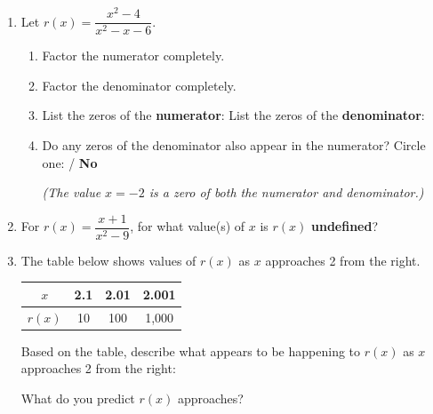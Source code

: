 \documentclass[10pt]{article}
\begin{document}
\namedateperiod

\vspace{0.14in}

\begin{enumerate}[itemsep=14pt]

\item Let $r(x) = \dfrac{x^2 - 4}{x^2 - x - 6}$.

\begin{enumerate}[label=(\alph*), itemsep=6pt]
  \item Factor the numerator completely. \quad {}

  \item Factor the denominator completely. \quad {}

  \item List the zeros of the \textbf{numerator}:  \quad
        List the zeros of the \textbf{denominator}: 

  \item Do any zeros of the denominator also appear in the numerator? Circle one:
        \quad {} \quad / \quad \textbf{No}

        \textit{(The value $x = -2$ is a zero of both the numerator and denominator.)}
\end{enumerate}

\item For $r(x) = \dfrac{x + 1}{x^2 - 9}$, for what value(s) of $x$ is $r(x)$ \textbf{undefined}?

\vspace{0.1in}

\item The table below shows values of $r(x)$ as $x$ approaches 2 from the right.

\smallskip
\renewcommand{\arraystretch}{1.3}
\begin{tabular}{|c|c|c|c|}
\hline
$x$    & 2.1 & 2.01 & 2.001 \\
\hline
$r(x)$ & 10  & 100  & 1{,}000 \\
\hline
\end{tabular}
\smallskip

Based on the table, describe what appears to be happening to $r(x)$ as $x$ approaches 2
from the right:

\vspace{0.1in}

\vspace{0.1in}
What do you predict $r(x)$ approaches? 

\end{enumerate}
\end{document}
